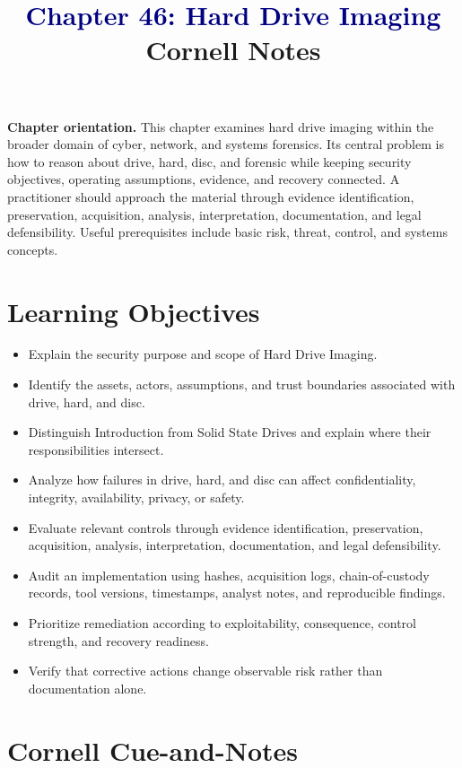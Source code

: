 \documentclass[11pt]{article}
\title{\textcolor{Navy}{Chapter 46: Hard Drive Imaging}\\[2mm]\large Cornell Notes}
\author{}
\date{}
\begin{document}
\maketitle
\thispagestyle{fancy}
\vspace{-1.5em}
\begin{orientationbox}
\textbf{Chapter orientation.} This chapter examines hard drive imaging within the broader domain of cyber, network, and systems forensics. Its central problem is how to reason about drive, hard, disc, and forensic while keeping security objectives, operating assumptions, evidence, and recovery connected. A practitioner should approach the material through evidence identification, preservation, acquisition, analysis, interpretation, documentation, and legal defensibility. Useful prerequisites include basic risk, threat, control, and systems concepts.
\end{orientationbox}
\section*{Learning Objectives}
\begin{itemize}
\item Explain the security purpose and scope of Hard Drive Imaging.
\item Identify the assets, actors, assumptions, and trust boundaries associated with drive, hard, and disc.
\item Distinguish Introduction from Solid State Drives and explain where their responsibilities intersect.
\item Analyze how failures in drive, hard, and disc can affect confidentiality, integrity, availability, privacy, or safety.
\item Evaluate relevant controls through evidence identification, preservation, acquisition, analysis, interpretation, documentation, and legal defensibility.
\item Audit an implementation using hashes, acquisition logs, chain-of-custody records, tool versions, timestamps, analyst notes, and reproducible findings.
\item Prioritize remediation according to exploitability, consequence, control strength, and recovery readiness.
\item Verify that corrective actions change observable risk rather than documentation alone.
\end{itemize}
\section*{Cornell Cue-and-Notes}
\end{document}
